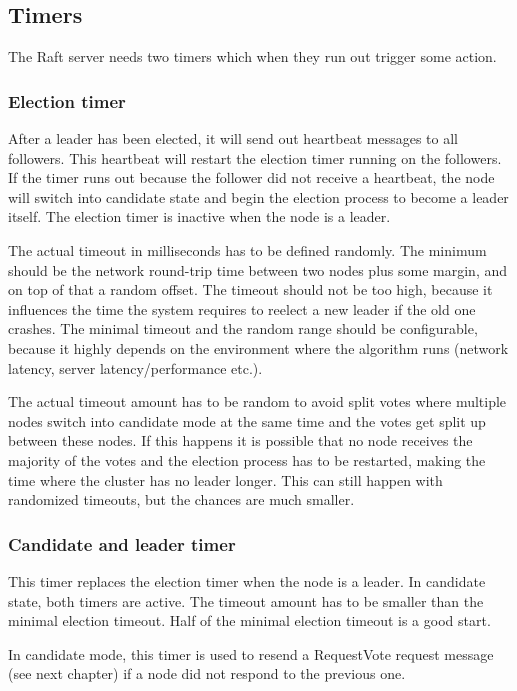 \subsection{Timers}
The Raft server needs two timers which when they run out trigger some action.

\subsubsection*{Election timer}
After a leader has been elected, it will send out heartbeat messages to all followers. This heartbeat
will restart the election timer running on the followers. If the timer runs out because the follower did not 
receive a heartbeat, the node will switch into candidate state and begin the election process to become a leader itself.
The election timer is inactive when the node is a leader.

The actual timeout in milliseconds has to be defined randomly. The minimum should be the network round-trip time between two nodes plus some margin,
and on top of that a random offset. The timeout should not be too high, because it influences the time the system requires to reelect a new leader
if the old one crashes. The minimal timeout and the random range should be configurable, because it highly depends on the environment where the algorithm runs
(network latency, server latency/performance etc.).

The actual timeout amount has to be random to avoid split votes where multiple nodes switch into candidate mode at the same time and the votes get split
up between these nodes. If this happens it is possible that no node receives the majority of the votes and the election process has to be restarted,
making the time where the cluster has no leader longer. This can still happen with randomized timeouts, but the chances are much smaller.

\subsubsection*{Candidate and leader timer}
This timer replaces the election timer when the node is a leader. In candidate state, both timers are active.
The timeout amount has to be smaller than the minimal election timeout. Half of the minimal election timeout is a good start.

In candidate mode, this timer is used to resend a RequestVote request message (see next chapter) if a node did not respond to the previous one.

